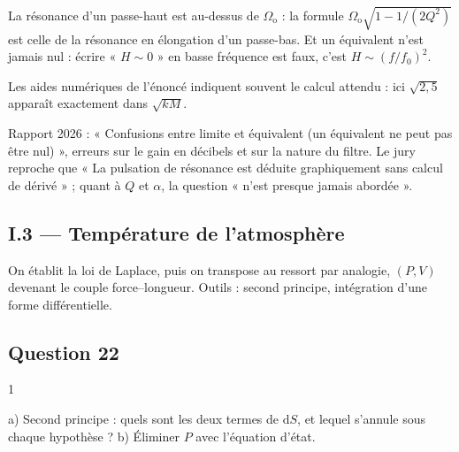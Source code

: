 \documentclass[11pt,a4paper]{article}
\begin{document}
\begin{piege}

La résonance d'un passe-haut est au-dessus de \(\Omega_{\mathrm{o}}\) : la formule \(\Omega_{\mathrm{o}}\sqrt{1-1/(2Q^2)}\) est celle de la résonance en élongation d'un passe-bas. Et un équivalent n'est jamais nul : écrire « \(H\sim0\) » en basse fréquence est faux, c'est \(H\sim(f/f_0)^2\).

\end{piege}

\begin{methode}

Les aides numériques de l'énoncé indiquent souvent le calcul attendu : ici \(\sqrt{2{,}5}\) apparaît exactement dans \(\sqrt{kM}\).

\end{methode}

\begin{jury}

Rapport 2026 : « Confusions entre limite et équivalent (un équivalent ne peut pas être nul) », erreurs sur le gain en décibels et sur la nature du filtre. Le jury reproche que « La pulsation de résonance est déduite graphiquement sans calcul de dérivé » ; quant à \(Q\) et \(\alpha\), la question « n'est presque jamais abordée ».

\end{jury}

\hypertarget{i.3-tempuxe9rature-de-latmosphuxe8re}{%
\subsection{I.3 --- Température de l'atmosphère}\label{i.3-tempuxe9rature-de-latmosphuxe8re}}

On établit la loi de Laplace, puis on transpose au ressort par analogie, \((P,V)\) devenant le couple force--longueur. Outils : second principe, intégration d'une forme différentielle.

\hypertarget{question-22}{%
\subsection{Question 22}\label{question-22}}

\begin{indication}{1}

a) Second principe : quels sont les deux termes de \(\mathrm{d}S\), et lequel s'annule sous chaque hypothèse ? b) Éliminer \(P\) avec l'équation d'état.

\end{indication}
\end{document}
